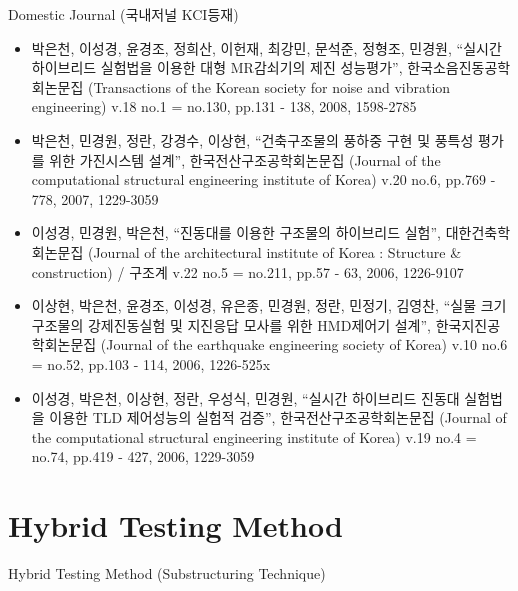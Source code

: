 \documentclass[usepdftitle=false]{beamer}
\newcommand\Fontvi{\fontsize{6}{7.2}\selectfont}
\begin{document}
\begin{frame}{Domestic Journal (국내저널 KCI등재)}
\Fontvi
\begin{itemize}
\item 박은천, 이성경, 윤경조, 정희산, 이헌재, 최강민, 문석준, 정형조, 민경원, “실시간 하이브리드 실험법을 이용한 대형 MR감쇠기의 제진 성능평가”, 한국소음진동공학회논문집 (Transactions of the Korean society for noise and vibration engineering) v.18 no.1 = no.130, pp.131 - 138, 2008, 1598-2785
\item 박은천, 민경원, 정란, 강경수, 이상현, “건축구조물의 풍하중 구현 및 풍특성 평가를 위한 가진시스템 설계”, 한국전산구조공학회논문집 (Journal of the computational structural engineering institute of Korea) v.20 no.6, pp.769 - 778, 2007, 1229-3059
\item 이성경, 민경원, 박은천, “진동대를 이용한 구조물의 하이브리드 실험”, 대한건축학회논문집 (Journal of the architectural institute of Korea : Structure \& construction) / 구조계 v.22 no.5 = no.211, pp.57 - 63, 2006, 1226-9107
\item 이상현, 박은천, 윤경조, 이성경, 유은종, 민경원, 정란, 민정기, 김영찬, “실물 크기 구조물의 강제진동실험 및 지진응답 모사를 위한 HMD제어기 설계”, 한국지진공학회논문집 (Journal of the earthquake engineering society of Korea) v.10 no.6 = no.52, pp.103 - 114, 2006, 1226-525x
\item 이성경, 박은천, 이상현, 정란, 우성식, 민경원, “실시간 하이브리드 진동대 실험법을 이용한 TLD 제어성능의 실험적 검증”, 한국전산구조공학회논문집 (Journal of the computational structural engineering institute of Korea) v.19 no.4 = no.74, pp.419 - 427, 2006, 1229-3059
\end{itemize}
\end{frame}



\section{Hybrid Testing Method}
\begin{frame}{Hybrid Testing Method (Substructuring Technique)}
\begin{figure}[ht]
\centering
{}\hfill
{}
\end{figure}
\end{frame}
\end{document}
